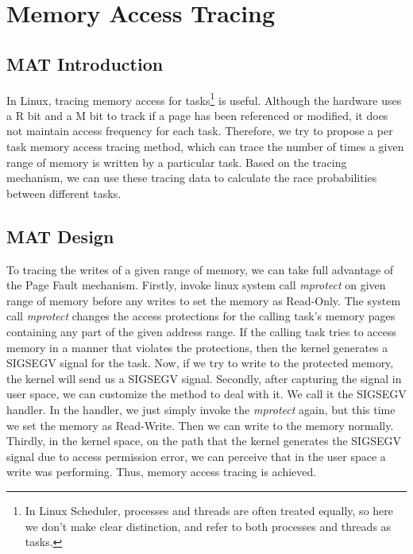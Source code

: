 
\chapter{Memory Access Tracing}

\section{MAT Introduction}

In Linux, tracing memory access for tasks\footnote{In Linux Scheduler, processes and threads are often treated equally, so here we don't make clear distinction, and refer to both processes and threads as tasks.} is useful. Although the hardware uses a R bit and a M bit to track if a page has been referenced or modified, it does not maintain access frequency for each task. Therefore, we try to propose a per task memory access tracing method, which can trace the number of times a given range of memory is written by a particular task. Based on the tracing mechanism, we can use these tracing data to calculate the race probabilities between different tasks.

\section{MAT Design}

To tracing the writes of a given range of memory, we can take full advantage of the Page Fault mechanism. Firstly, invoke linux system call \textit{mprotect} on given range of memory before any writes to set the memory as Read-Only. The system call \textit{mprotect} changes the access protections for the calling task's memory pages containing any part of the given address range. If the calling task tries to access memory in a manner that violates the protections, then the kernel generates a SIGSEGV signal for the task\cite{mprotect}. Now, if we try to write to the protected memory, the kernel will send us a SIGSEGV signal. Secondly, after capturing the signal in user space, we can customize the method to deal with it. We call it the SIGSEGV handler. In the handler, we just simply invoke the \textit{mprotect} again, but this time we set the memory as Read-Write. Then we can write to the memory normally. Thirdly, in the kernel space, on the path that the kernel generates the SIGSEGV signal due to access permission error, we can perceive that in the user space a write was performing. Thus, memory access tracing is achieved.


